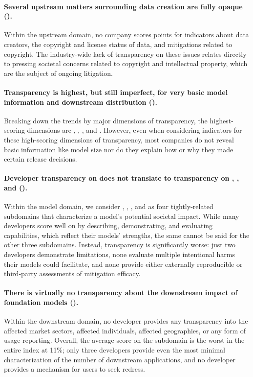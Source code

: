 \paragraph{Several upstream matters surrounding data creation are fully opaque ().}
Within the upstream domain, no company scores points for indicators about data creators, the copyright and license status of data, and mitigations related to copyright.
The industry-wide lack of transparency on these issues relates directly to pressing societal concerns related to copyright and intellectual property, which are the subject of ongoing litigation.

\paragraph{Transparency is highest, but still imperfect, for very basic model information and downstream distribution ().}
Breaking down the trends by major dimensions of transparency, the highest-scoring dimensions are \methods, \modelbasics, \capabilities, and \distribution.
However, even when considering indicators for these high-scoring dimensions of transparency, most companies do not reveal basic information like model size nor do they explain how or why they made certain release decisions. 

\paragraph{Developer transparency on \capabilities does not translate to transparency on \limitations, \risks, and \modelmitigations ().}
Within the model domain, we consider \capabilities, \limitations, \risks, and \modelmitigations as four tightly-related subdomains that characterize a model's potential societal impact.
While many developers score well on \capabilities by describing, demonstrating, and evaluating capabilities, which reflect their models' strengths, the same cannot be said for the other three subdomains.
Instead, transparency is significantly worse: just two developers demonstrate limitations, none evaluate multiple intentional harms their models could facilitate, and none provide either externally reproducible or third-party assessments of mitigation efficacy.

\paragraph{There is virtually no transparency about the downstream impact of foundation models  ().}
Within the downstream domain, no developer provides any transparency into the affected market sectors, affected individuals, affected geographies, or any form of usage reporting.
Overall, the average score on the \impact subdomain is the worst in the entire index at 11\%; only three developers provide even the most minimal characterization of the number of downstream applications, and no developer provides a mechanism for users to seek redress.

